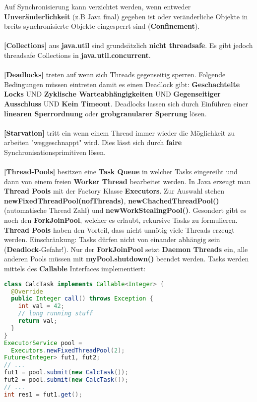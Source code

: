 \documentclass[8pt]{extarticle}
\let\oldtextbf\textbf
\renewcommand{\textbf}{\tiny\oldtextbf}
\begin{document}
\begin{multicols*}{5}
Auf Synchronisierung kann verzichtet werden, wenn entweder \textbf{Unveränderlichkeit} (z.B Java final) gegeben ist oder veränderliche Objekte in breits synchronisierte Objekte eingesperrt sind (\textbf{Confinement}).\\\\
\textbf{[Collections]} aus \textbf{java.util} sind grundsätzlich \textbf{nicht threadsafe}. Es gibt jedoch threadsafe Collections in \textbf{java.util.concurrent}.\\\\
\textbf{[Deadlocks]} treten auf wenn sich Threads gegenseitig sperren. Folgende Bedingungen müssen eintreten damit es einen Deadlock gibt: \textbf{Geschachtelte Locks} UND \textbf{Zyklische Warteabhängigkeiten} UND \textbf{Gegenseitiger Ausschluss} UND \textbf{Kein Timeout}. Deadlocks lassen sich durch Einführen einer \textbf{linearen Sperrordnung} oder \textbf{grobgranularer Sperrung} lösen.\\\\
\textbf{[Starvation]} tritt ein wenn einem Thread immer wieder die Möglichkeit zu arbeiten "weggeschnappt" wird. Dies lässt sich durch \textbf{faire} Synchronisationsprimitiven lösen.\\\\
\textbf{[Thread-Pools]} besitzen eine \textbf{Task Queue} in welcher Tasks eingereiht und dann von einem freien \textbf{Worker Thread} bearbeitet werden. In Java erzeugt man \textbf{Thread Pools} mit der Factory Klasse \textbf{Executors}. Zur Auswahl stehen \textbf{newFixedThreadPool(nofThreads)}, \textbf{newChachedThreadPool()} (automatische Thread Zahl) und \textbf{newWorkStealingPool()}. Gesondert gibt es noch den \textbf{ForkJoinPool}, welcher es erlaubt, rekursive Tasks zu formulieren. \textbf{Thread Pools} haben den Vorteil, dass nicht unnötig viele Threads erzeugt werden. Einschränkung: Tasks dürfen nicht von einander abhängig sein (\textbf{Deadlock}-Gefahr!). Nur der \textbf{ForkJoinPool} setzt \textbf{Daemon Threads} ein, alle anderen Pools müssen mit \textbf{myPool.shutdown()} beendet werden. Tasks werden mittels des \textbf{Callable} Interfaces implementiert:
\begin{lstlisting}[language=java]
class CalcTask implements Callable<Integer> {
  @Override
  public Integer call() throws Exception {
    int val = 42;
    // long running stuff
    return val;
  }
}
ExecutorService pool =
  Executors.newFixedThreadPool(2);
Future<Integer> fut1, fut2;
// ...
fut1 = pool.submit(new CalcTask());
fut2 = pool.submit(new CalcTask());
// ...
int res1 = fut1.get();

\end{lstlisting}
\end{multicols*}
\end{document}
